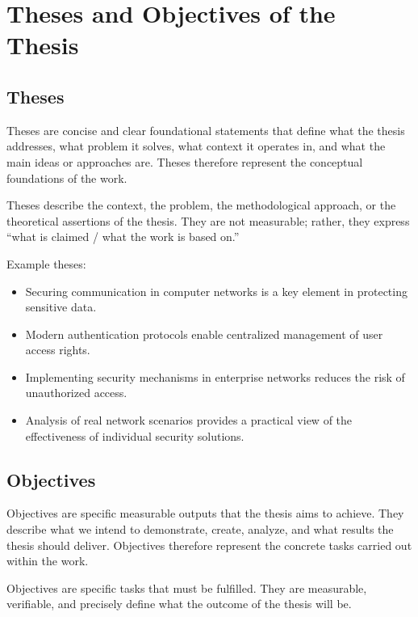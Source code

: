 \section*{Theses and Objectives of the \typeofwork{} Thesis}


\normalsize

\subsection*{Theses}

Theses are concise and clear foundational statements that define what the thesis addresses, what problem it solves, what context it operates in, and what the main ideas or approaches are. Theses therefore represent the conceptual foundations of the work.

Theses describe the context, the problem, the methodological approach, or the theoretical assertions of the thesis.
They are not measurable; rather, they express “what is claimed / what the work is based on.”

Example theses:

\begin{itemize}
	\item Securing communication in computer networks is a key element in protecting sensitive data.
	\item Modern authentication protocols enable centralized management of user access rights.
	\item Implementing security mechanisms in enterprise networks reduces the risk of unauthorized access.
	\item Analysis of real network scenarios provides a practical view of the effectiveness of individual security solutions.
\end{itemize}


\subsection*{Objectives}

Objectives are specific measurable outputs that the thesis aims to achieve. They describe what we intend to demonstrate, create, analyze, and what results the thesis should deliver. Objectives therefore represent the concrete tasks carried out within the work.

Objectives are specific tasks that must be fulfilled. They are measurable, verifiable, and precisely define what the outcome of the thesis will be.

